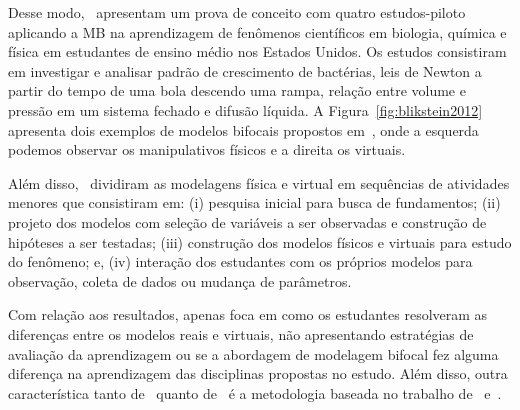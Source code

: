 Desse modo,~\cite{Blikstein:2012} apresentam um prova de conceito com quatro estudos-piloto aplicando a MB na aprendizagem de fenômenos científicos em biologia, química e física em estudantes de ensino médio nos Estados Unidos. Os estudos consistiram em investigar e analisar padrão de crescimento de bactérias, leis de Newton a partir do tempo de uma bola descendo uma rampa, relação entre volume e pressão em um sistema fechado e difusão líquida. A Figura~\ref{fig:blikstein2012} apresenta dois exemplos de modelos bifocais propostos em~\cite{Blikstein:2012}, onde a esquerda podemos observar os manipulativos físicos e a direita os virtuais.

Além disso,~\cite{Blikstein:2012} dividiram as modelagens física e virtual em sequências de atividades menores que consistiram em: (i) pesquisa inicial para busca de fundamentos; (ii) projeto dos modelos com seleção de variáveis a ser observadas e construção de hipóteses a ser testadas; (iii) construção dos modelos físicos e virtuais para estudo do fenômeno; e, (iv) interação dos estudantes com os próprios modelos para observação, coleta de dados ou mudança de parâmetros. 

Com relação aos resultados, \cite{Blikstein:2012} apenas foca em como os estudantes resolveram as diferenças entre os modelos reais e virtuais, não apresentando estratégias de avaliação da aprendizagem ou se a abordagem de modelagem bifocal fez alguma diferença na aprendizagem das disciplinas propostas no estudo. Além disso, outra característica tanto de~\cite{Blikstein:2012} quanto de~\cite{Blikstein2016} é a metodologia baseada no trabalho de~\cite{Papert:1980} e~\cite{Papert:1994}.


